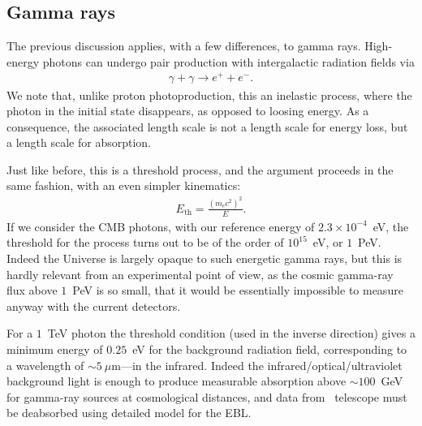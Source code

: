\subsection{Gamma rays}

The previous discussion applies, with a few differences, to gamma rays. High-energy
photons can undergo pair production with intergalactic radiation fields via
\begin{align*}
  \gamma + \gamma \rightarrow e^{+} + e^{-}.
\end{align*}
We note that, unlike proton photoproduction, this an inelastic process, where
the photon in the initial state disappears, as opposed to loosing energy. As a
consequence, the associated length scale is not a length scale for energy loss,
but a length scale for absorption.

Just like before, this is a threshold process, and the argument proceeds in the
same fashion, with an even simpler kinematics:
\begin{align}
  E_\text{th} = \frac{(m_e c^2)^2}{E}.
\end{align}
If we consider the CMB photons, with our reference energy of $2.3 \times 10^{-4}$~eV,
the threshold for the process turns out to be of the order of $10^{15}$~eV, or
$1$~PeV. Indeed the Universe is largely opaque to such energetic gamma rays, but
this is hardly relevant from an experimental point of view, as the cosmic gamma-ray
flux above $1$~PeV is so small, that it would be essentially impossible to measure
anyway with the current detectors.

For a $1$~TeV photon the threshold condition (used in the inverse direction) gives
a minimum energy of $0.25$~eV for the background radiation field, corresponding to
a wavelength of $\sim 5~\mu$m---in the infrared. Indeed the infrared/optical/ultraviolet
background light is enough to produce measurable absorption above $\sim 100$~GeV
for gamma-ray sources at cosmological distances, and data from \cherenkov\ telescope
must be deabsorbed using detailed model for the EBL.

